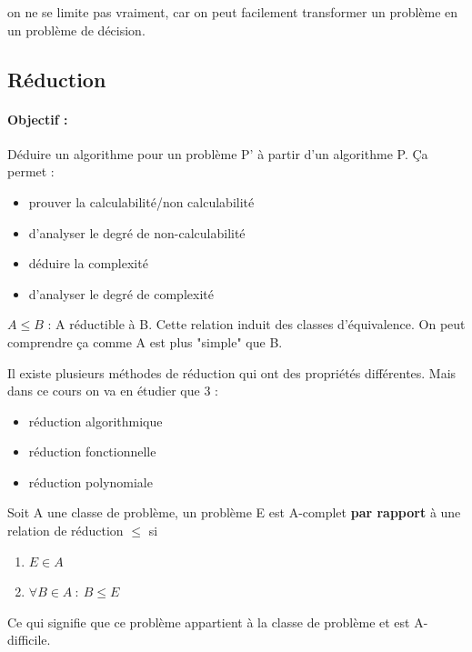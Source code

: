 \begin{myrem}
	on ne se limite pas vraiment, car on 
	peut facilement transformer un problème en un problème de décision.
\end{myrem}

\subsection{Réduction}
\label{sub:r_duction}

\paragraph{Objectif :} Déduire un algorithme pour un problème P' à partir d'un 
algorithme P. Ça permet :
\begin{itemize}
	\item prouver la calculabilité/non calculabilité
	\item d'analyser le degré de non-calculabilité
	\item déduire la complexité
	\item d'analyser le degré de complexité
\end{itemize}

\begin{mydef}
	$A \leq B$ : A réductible à B. Cette relation induit des classes 
	d'équivalence. On peut comprendre ça comme A est plus "simple" que B.
\end{mydef}

Il existe plusieurs méthodes de réduction qui ont des propriétés différentes.
Mais dans ce cours on va en étudier 
que 3 :
\begin{itemize}
	\item réduction algorithmique
	\item réduction fonctionnelle 
	\item réduction polynomiale
\end{itemize}

\begin{mydef}[A-complet]
	Soit A une classe de problème, un problème E est A-complet
	\textbf{par rapport} à une relation de réduction $\leq$ si 
	\begin{enumerate}
		\item $E \in A$
		\item $\forall B \in A \ : \ B \leq E$
	\end{enumerate}
\end{mydef}

\begin{myrem}
	Ce qui signifie que ce problème appartient à la classe de problème et 
	est A-difficile.	
\end{myrem}

